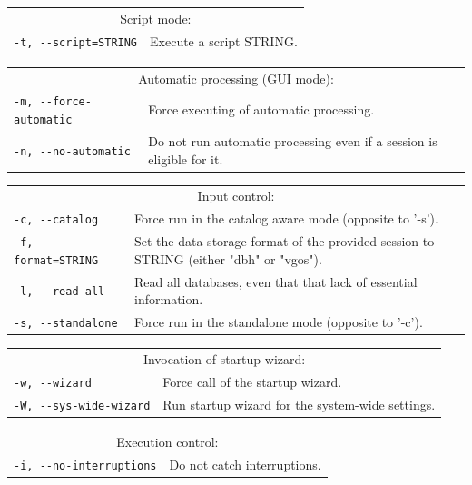 \documentclass [10pt,letterpaper]{report}
\begin{document}
{\begin{tabular}{p{\leftSp}p{\riteSp}}
\multicolumn{2}{c}{Script mode:}\\
{\tt -t, -{}-script=STRING}     & Execute a script STRING.\\
\end{tabular}
\vspace{5mm}

\begin{tabular}{p{\leftSp}p{\riteSp}}
\multicolumn{2}{c}{Automatic processing (GUI mode):}\\
{\tt -m, -{}-force-automatic}   & Force executing of automatic processing.\\
{\tt -n, -{}-no-automatic}      & Do not run automatic processing even if a session is eligible for it.\\
\end{tabular}
\vspace{5mm}

\begin{tabular}{p{\leftSp}p{\riteSp}}
\multicolumn{2}{c}{Input control:}\\
{\tt -c, -{}-catalog}           & Force run in the catalog aware mode (opposite to '-s').\\
{\tt -f, -{}-format=STRING}     & Set the data storage format of the provided session to STRING (either "dbh" or "vgos").\\
{\tt -l, -{}-read-all}          & Read all databases, even that that lack of essential information.\\
{\tt -s, -{}-standalone}        & Force run in the standalone mode (opposite to '-c').\\
\end{tabular}
\vspace{5mm}

\begin{tabular}{p{\leftSp}p{\riteSp}}
\multicolumn{2}{c}{Invocation of startup wizard:}\\
{\tt -w, -{}-wizard}            & Force call of the startup wizard.\\
{\tt -W, -{}-sys-wide-wizard}   & Run startup wizard for the system-wide settings.\\
\end{tabular}
\vspace{5mm}

\begin{tabular}{p{\leftSp}p{\riteSp}}
\multicolumn{2}{c}{Execution control:}\\
{\tt -i, -{}-no-interruptions}  & Do not catch interruptions.\\
\end{tabular}
\vspace{5mm}

}
\end{document}
